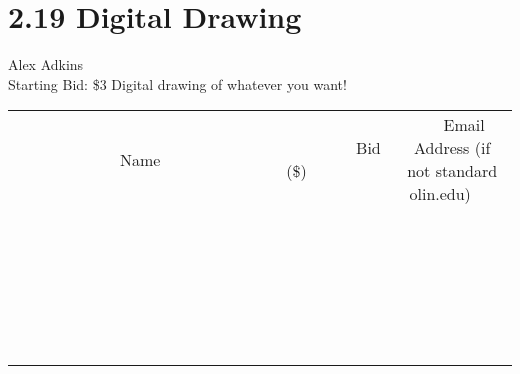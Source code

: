 \documentclass[11pt]{article}
\begin{document}
\section*{2.19 Digital Drawing}
Alex Adkins
\\
Starting Bid: \$3
\newline
Digital drawing of whatever you want!
\\[6ex]
\begin{tabular}{c c c}
~~~~~~~~~~~~~Name~~~~~~~~~~~~~ & ~~~~~~~~~Bid (\$)~~~~~~~~~  & ~~~Email Address (if not standard olin.edu)~~~\\
 & & \\
\hline
 & & \\
\hline
 & & \\
\hline
 & & \\
\hline
 & & \\
\hline
 & & \\
\hline
 & & \\
\hline
 & & \\
\hline
 & & \\
\hline
 & & \\
\hline
 & & \\
\hline
 & & \\
\hline
 & & \\
\hline
 & & \\
\hline
 & & \\
\hline
 & & \\
\hline
 & & \\
\hline
 & & \\
\hline
 & & \\
\hline
 & & \\
\hline
 & & \\
\hline
 & & \\
\hline
 & & \\
\hline
 & & \\
\hline
 & & \\
\hline
 & & \\
\hline
\end{tabular}
\newpage
\end{document}
